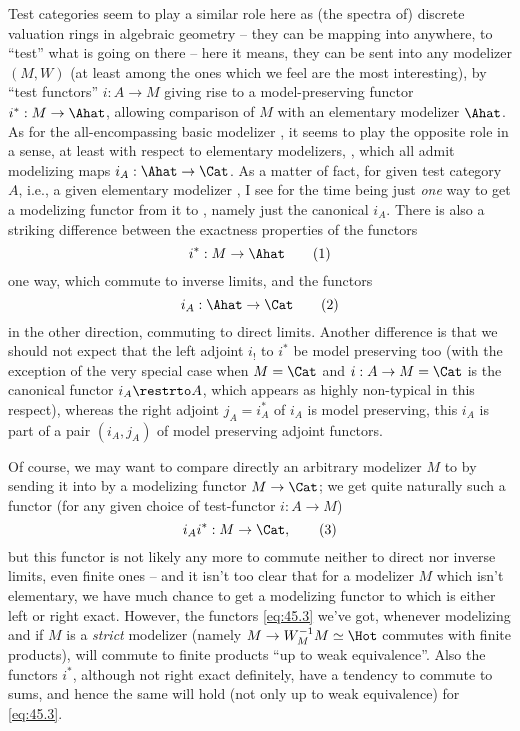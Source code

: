 Test categories seem to play a similar role here as (the
spectra of) discrete valuation rings in algebraic geometry -- they can
be mapping into anywhere, to ``test'' what is going on there -- here
it means, they can be sent into any modelizer $(M,W)$ (at least among
the ones which we feel are the most interesting), by ``test functors''
$i:A\to M$ giving rise to a model-preserving functor $i^*:M\to\Ahat$,
allowing comparison of $M$ with an elementary modelizer $\Ahat$. As
for the all-encompassing basic modelizer \Cat, it seems to play the
opposite role in a sense, at least with respect to elementary
modelizers, \Ahat, which all admit modelizing maps
$i_A:\Ahat\to\Cat$. As a matter of fact, for given test category $A$,
i.e., a given elementary modelizer \Ahat, I see for the time being
just \emph{one} way to get a modelizing functor from it to \Cat,
namely just the canonical $i_A$. There is also a striking difference
between the exactness properties of the functors
\begin{equation}
  \label{eq:45.1}
  i^*:M\to\Ahat\tag{1}
\end{equation}
one way, which commute to inverse limits, and the functors
\begin{equation}
  \label{eq:45.2}
  i_A:\Ahat\to\Cat\tag{2}
\end{equation}
in the other direction, commuting to direct limits. Another difference
is that we should not expect that the left adjoint $i_!$ to $i^*$ be
model preserving too (with the exception of the very special case when
$M=\Cat$ and $i:A\to M=\Cat$ is the canonical functor $i_A\restrto A$,
which appears as highly non-typical in this respect), whereas the
right adjoint $j_A=i_A^*$ of $i_A$ is model preserving, this $i_A$ is
part of a pair $(i_A,j_A)$ of model preserving adjoint functors.

Of course, we may want to compare directly an arbitrary modelizer $M$
to \Cat{} by sending it into \Cat{} by a modelizing functor
$M\to\Cat$; we get quite naturally such a functor (for any given
choice of test-functor $i:A\to M$)
\begin{equation}
  \label{eq:45.3}
  i_Ai^*: M \to \Cat,\tag{3}
\end{equation}
but this functor is not likely any more to commute neither to direct
nor inverse limits, even finite ones -- and it isn't too clear that
for a modelizer $M$ which isn't elementary, we have much chance to get
a modelizing functor to \Cat{} which is either left or right
exact. However, the functors \eqref{eq:45.3} we've got, whenever
modelizing and if $M$ is a \emph{strict} modelizer (namely $M\to
W_M^{-1}M\simeq\Hot$ commutes with finite products), will commute to
finite products ``up to weak equivalence''. Also the functors $i^*$,
although not right exact definitely, have a tendency to commute to
sums, and hence the same will hold (not only up to weak equivalence)
for \eqref{eq:45.3}.

